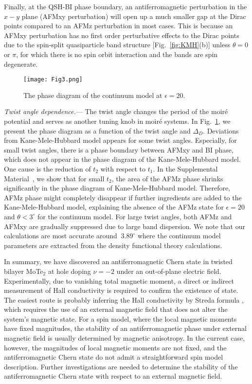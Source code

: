 \documentclass[twocolumn,aps,prl,superscriptaddress]{revtex4-2}
\begin{document}
Finally, at the QSH-BI phase boundary, an antiferromagnetic perturbation in the $x-y$ plane (AFMxy perturbation) will open up a much smaller gap at the Dirac points compared to an AFMz perturbation in most cases. This is because an AFMxy perturbation has no first order perturbative effects to the Dirac points due to the spin-split quasiparticle band structure [Fig.~\ref{fig:KMH}(b)] unless $\theta = 0$ or $\pi$, for which there is no spin orbit interaction and the bands are spin degenerate.

\begin{figure}
\centering
\texttt{[image: Fig3.png]}
\caption{The phase diagram of the continuum model at $\epsilon = 20$. \label{fig:angle}}
\end{figure}

\textit{Twist angle dependence.}---
The twist angle changes the period of the moir\'e potential and serves as another tuning knob in moir\'e systems. In Fig.~\ref{fig:angle}, we present the phase diagram as a function of the twist angle and $\Delta_D$. Deviations from Kane-Mele-Hubbard model appears for some twist angles. Especially, for small twist angles, there is a phase boundary between AFMxy and BI phase, which does not appear in the phase diagram of the Kane-Mele-Hubbard model. One cause is the reduction of $t_2$ with respect to $t_1$. In the Supplemental Material~\cite{supp}, we show that for small $t_2$, the area of the AFMz phase shrinks significantly in the phase diagram of Kane-Mele-Hubbard model. Therefore, AFMz phase might completely disappear if further ingredients are added to the Kane-Mele-Hubbard model, explaining the absence of the AFMz state for $\epsilon = 20$ and $\theta < 3^\circ$ for the continuum model. For large twist angles, both AFMz and AFMxy are gradually suppressed due to large band dispersion. We note that our calculations are most accurate around $~3.89^\circ$ where the continuum model parameters are extracted from the density functional theory calculations.

In summary, we have discovered an antiferromagnetic Chern state in twisted bilayer MoTe$_2$ at hole doping $\nu = -2$ under an out-of-plane electric field. Experimentally, due to vanishing total magnetic moment, a direct or indirect measurement of Hall conductivity is required to confirm the existence of state. The easiest route is probably inferring the Hall conductivity by Streda formula \cite{cai2023signatures}, which requires the use of an external magnetic field that does not alter the system's magnetic state. For a spin model, where the local magnetic moments have fixed magnitudes, the stability of an antiferromagnetic phase under external magnetic field is usually determined by magnetic anisotropy. In the current case, however, the magnitudes of local magnetic moments are not fixed, and the antiferromagnetic Chern state do not admit a straightforward spin model description. Further investigations are needed to determine the stability of the antiferromagnetic Chern state with respect to an external magnetic field.
\end{document}
